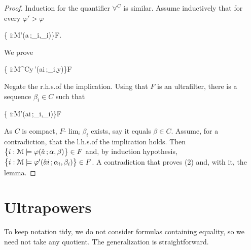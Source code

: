 \documentclass[12pt,letterpaper,oneside,reqno]{amsart}
\theoremstyle{plain}
\theoremstyle{remark}
\begin{document}
\begin{proof}
  Induction for the quantifier $\forall^C$ is similar.
  Assume inductively that for every $\varphi'>\varphi$

  {\Rightarrow}
  {\big\{ i:{\EuScript M}\models\varphi'(\hat a\,;\alpha_i,\beta_i)\big\}\in F}.
  
  We prove

  {\Rightarrow}
  {\big\{ i:{\EuScript M}\models\forall^C\!y\,\varphi'(\hat ai\,;\alpha_i,y)\big\}\in F}
  
 
  Negate the r.h.s.\@ of the implication.
  Using that $F$ is an ultrafilter, there is a sequence $\beta_i\in C$ such that 

  \ceq{}
  { }
  {\big\{ i:{\EuScript M}\not\models\varphi'(\hat ai\,;\alpha_i,\beta_i)\big\}\in F}
  
  As $C$ is compact, $F\mbox{-}\lim_i\beta_i$ exists, say it equals $\beta\in C$.
  Assume,  for a contradiction, that the l.h.s.\@ of the implication holds.
  Then $\big\{i:{\EuScript M}\models\varphi(\hat a\,; \alpha,\beta)\big\}\in F$ and, by induction hypothesis, $\big\{ i:{\EuScript M}\models\varphi'(\hat ai\,;\alpha_i,\beta_i)\big\}\in F$. A contradiction that proves (2) and, with it, the lemma.
\end{proof}

\section{Ultrapowers}\label{ultrapws}

\def\ceq#1#2#3{\parbox[t]{25ex}{$\displaystyle #1$}\parbox{5ex}{\hfil $#2$}{$\displaystyle #3$}}


To keep notation tidy, 
we do not consider formulas containing equality, so we need not take any quotient.
The generalization is straightforward.
\end{document}
